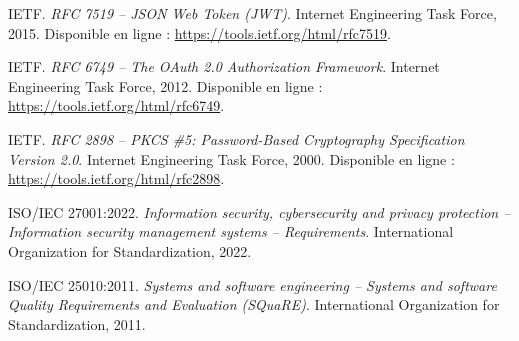 \begin{enumerate}[label={[\arabic*]}, resume]

\item IETF. \textit{RFC 7519 -- JSON Web Token (JWT)}. Internet Engineering Task Force, 2015. Disponible en ligne : \url{https://tools.ietf.org/html/rfc7519}.

\item IETF. \textit{RFC 6749 -- The OAuth 2.0 Authorization Framework}. Internet Engineering Task Force, 2012. Disponible en ligne : \url{https://tools.ietf.org/html/rfc6749}.

\item IETF. \textit{RFC 2898 -- PKCS \#5: Password-Based Cryptography Specification Version 2.0}. Internet Engineering Task Force, 2000. Disponible en ligne : \url{https://tools.ietf.org/html/rfc2898}.

\item ISO/IEC 27001:2022. \textit{Information security, cybersecurity and privacy protection -- Information security management systems -- Requirements}. International Organization for Standardization, 2022.

\item ISO/IEC 25010:2011. \textit{Systems and software engineering -- Systems and software Quality Requirements and Evaluation (SQuaRE)}. International Organization for Standardization, 2011.

\end{enumerate}
